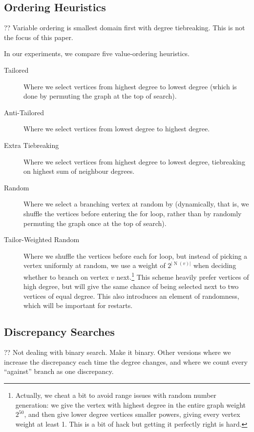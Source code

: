 \documentclass{article}
\begin{document}
\subsection{Ordering Heuristics}

?? Variable ordering is smallest domain first with degree tiebreaking. This is not the focus of this
paper.

In our experiments, we compare five value-ordering heuristics.

\begin{description}
    \item[Tailored] Where we select vertices from highest degree to lowest degree (which is done by
        permuting the graph at the top of search).
    \item[Anti-Tailored] Where we select vertices from lowest degree to highest degree.
    \item[Extra Tiebreaking] Where we select vertices from highest degree to lowest degree,
        tiebreaking on highest sum of neighbour degrees.
    \item[Random] Where we select a branching vertex at random by (dynamically, that is, we shuffle
        the vertices before entering the for loop, rather than by randomly permuting the graph once at the
        top of search).
    \item[Tailor-Weighted Random] Where we shuffle the vertices before each for loop, but instead of
        picking a vertex uniformly at random, we use a weight of
        $2^{\left|\operatorname{N}(v)\right|}$ when deciding whether to branch on vertex $v$
        next.\footnote{Actually, we cheat a bit to avoid range issues with random number generation:
        we give the vertex with highest degree in the entire graph weight $2^{50}$, and then give
        lower degree vertices smaller powers, giving every vertex weight at least 1. This is a bit
        of hack but getting it perfectly right is hard.} This scheme heavily prefer vertices of high
        degree, but will give the same chance of being selected next to two vertices of equal
        degree. This also introduces an element of randomness, which will be important for restarts.
\end{description}

\subsection{Discrepancy Searches}

?? Not dealing with binary search. Make it binary. Other versions where we increase the discrepancy
each time the degree changes, and where we count every ``against'' branch as one discrepancy.
\end{document}

